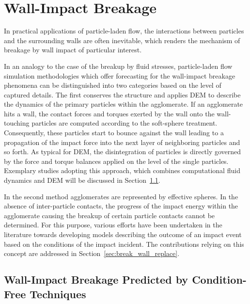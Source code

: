 \section{Wall-Impact Breakage}
\label{sec:litrev_wallimpact}

In practical applications of particle-laden flow, the interactions
between particles and the surrounding walls are often inevitable,
which renders the mechanism of breakage by wall impact of particular
interest.

In an analogy to the case of the breakup by fluid stresses,
particle-laden flow simulation methodologies which offer forecasting
for the wall-impact breakage phenomena can be distinguished into two
categories based on the level of captured details.  The first
conserves the structure and applies DEM to describe the dynamics of
the primary particles within the agglomerate. If an agglomerate hits a
wall, the contact forces and torques exerted by the wall onto the
wall-touching particles are computed according to the soft-sphere
treatment. Consequently, these particles start to bounce against the
wall leading to a propagation of the impact force into the next layer
of neighboring particles and so forth. As typical for DEM, the
disintegration of particles is directly governed by the force and
torque balances applied on the level of the single
particles. Exemplary studies adopting this approach, which combines
computational fluid dynamics and DEM will be discussed in
Section~\ref{sec:break_wall_DEM}.

In the second method agglomerates are represented by effective
spheres. In the absence of inter-particle contacts, the progress of
the impact energy within the agglomerate causing the breakup of
certain particle contacts cannot be determined. For this purpose,
various efforts have been undertaken in the literature towards
developing models describing the outcome of an impact event based on
the conditions of the impact incident. The contributions relying on
this concept are addressed in Section~\ref{sec:break_wall_replace}.

\subsection{Wall-Impact Breakage Predicted by Condition-Free
Techniques}
\label{sec:break_wall_DEM}

